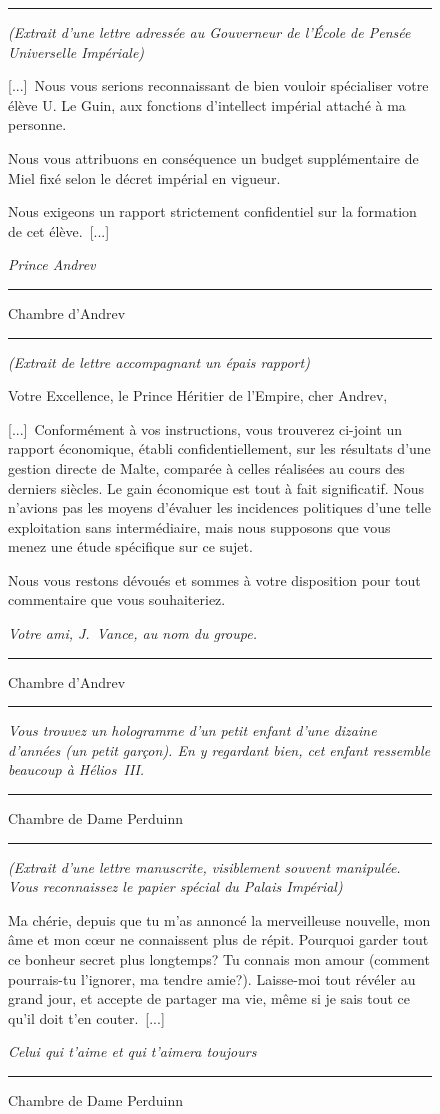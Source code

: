 \documentclass{article}
\newcommand{\newcharacter}{\clearpage\setcounter{figure}{0}}
\newcommand{\indice}[4]{
  \begin{figure}[H]
    \begin{center}
      \rule{0.5\textwidth}{1pt}
    \end{center}
    \begin{framed}
      \begin{samepage}
        \textit{#1}
        \nopagebreak

        #2

        \nopagebreak

        \hfill\textit{#3}
      \end{samepage}
    \end{framed}
    \caption{#4}
    \begin{center}
      \rule{0.5\textwidth}{1pt}
    \end{center}
  \end{figure}
}
\begin{document}
\indice
{(Extrait d'une lettre adressée au Gouverneur de l'École de Pensée Universelle
Impériale)}
{
    [...]~Nous vous serions reconnaissant de bien vouloir spécialiser votre
    élève U. Le Guin, aux fonctions d'intellect impérial attaché à ma personne.

    \nobreak

    Nous vous attribuons en conséquence un budget supplémentaire de Miel fixé
    selon le décret impérial en vigueur.

    \nobreak

    Nous exigeons un rapport strictement confidentiel sur la formation de cet
    élève.~[...]
}{Prince Andrev}
{Chambre d'Andrev}

\indice
{(Extrait de lettre accompagnant un épais rapport)}
{
    Votre Excellence, le Prince Héritier de l'Empire, cher Andrev,

    \nobreak

    [...]~Conformément à vos instructions, vous trouverez ci-joint un rapport
    économique, établi confidentiellement, sur les résultats d'une gestion
    directe de Malte, comparée à celles réalisées au cours des derniers
    siècles. Le gain économique est tout à fait significatif. Nous n'avions pas
    les moyens d'évaluer les incidences politiques d'une telle exploitation
    sans intermédiaire, mais nous supposons que vous menez une étude spécifique
    sur ce sujet.

    \nobreak

    Nous vous restons dévoués et sommes à votre disposition pour tout
    commentaire que vous souhaiteriez.
}{Votre ami, J.~Vance, au nom du groupe.}
{Chambre d'Andrev}

\newcharacter

\indice
{
    Vous trouvez un hologramme d'un petit enfant d'une dizaine d'années
    (un petit garçon). En y regardant bien, cet enfant ressemble beaucoup à
    Hélios~III.
}{}{}
{Chambre de Dame Perduinn}

\indice
{(Extrait d'une lettre manuscrite, visiblement souvent manipulée. Vous
reconnaissez le papier spécial du Palais Impérial)}
{
    Ma chérie, depuis que tu m'as annoncé la merveilleuse nouvelle, mon âme
    et mon cœur ne connaissent plus de répit. Pourquoi garder tout ce bonheur
    secret plus longtemps? Tu connais mon amour (comment pourrais-tu l'ignorer,
    ma tendre amie?). Laisse-moi tout révéler au grand jour, et accepte de
    partager ma vie, même si je sais tout ce qu'il doit t'en couter.~[...]
}{Celui qui t'aime et qui t'aimera toujours}
{Chambre de Dame Perduinn}
\end{document}
